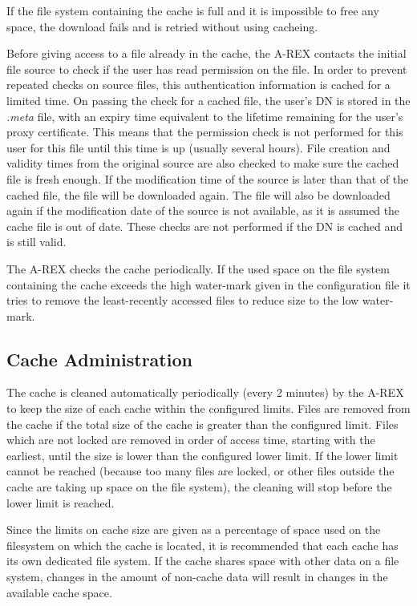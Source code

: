 \documentclass{article}                            %
\begin{document}
If the file system containing the cache is full and it is impossible
to free any space, the download fails and is retried without using
cacheing.

Before giving access to a file already in the cache, the A-REX
contacts the initial file source to check if the user has read
permission on the file. In order to prevent repeated checks on source
files, this authentication information is cached for a limited
time. On passing the check for a cached file, the user's DN is stored
in the \emph{.meta} file, with an expiry time equivalent to the
lifetime remaining for the user's proxy certificate. This means that
the permission check is not performed for this user for this file
until this time is up (usually several hours). File creation and
validity times from the original source are also checked to make sure
the cached file is fresh enough. If the modification time of the
source is later than that of the cached file, the file will be
downloaded again. The file will also be downloaded again if the
modification date of the source is not available, as it is assumed the
cache file is out of date. These checks are not performed if the DN is
cached and is still valid.

The A-REX checks the cache periodically. If the used space on the file
system containing the cache exceeds the high water-mark given in the
configuration file it tries to remove the least-recently accessed
files to reduce size to the low water-mark.

\subsection{Cache Administration}

The cache is cleaned automatically periodically (every 2 minutes) by
the A-REX to keep the size of each cache within the configured limits.
Files are removed from the cache if the total size of the cache is
greater than the configured limit. Files which are not locked are
removed in order of access time, starting with the earliest, until the
size is lower than the configured lower limit. If the lower limit
cannot be reached (because too many files are locked, or other files
outside the cache are taking up space on the file system), the
cleaning will stop before the lower limit is reached.

Since the limits on cache size are given as a percentage of space used
on the filesystem on which the cache is located, it is recommended
that each cache has its own dedicated file system. If the cache shares
space with other data on a file system, changes in the amount of
non-cache data will result in changes in the available cache space.
\end{document}
